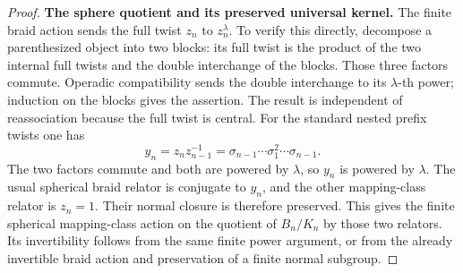 \begin{proof}
\par\medskip\noindent\textbf{The sphere quotient and its preserved universal kernel.}\quad
The finite braid action sends the full twist $z_n$ to
$z_n^\lambda$.  To verify this directly, decompose a
parenthesized object into two blocks: its full twist is
the product of the two internal full twists and the
double interchange of the blocks.  Those three factors
commute.  Operadic compatibility sends the double
interchange to its $\lambda$-th power; induction on the
blocks gives the assertion.  The result is independent
of reassociation because the full twist is central.
For the standard nested prefix twists one has
\[
 y_n=z_nz_{n-1}^{-1}
       =\sigma_{n-1}\cdots\sigma_1^2\cdots\sigma_{n-1}.
                                                               \tag{FPA.16}
\]
The two factors commute and both are powered by
$\lambda$, so $y_n$ is powered by $\lambda$.
The usual spherical braid relator is conjugate to
$y_n$, and the other mapping-class relator is $z_n=1$.
Their normal closure is therefore preserved.  This
gives the finite spherical mapping-class action on
the quotient of $B_n/K_n$ by those two relators.
Its invertibility follows from the same finite power
argument, or from the already invertible braid action
and preservation of a finite normal subgroup.


\end{proof}
